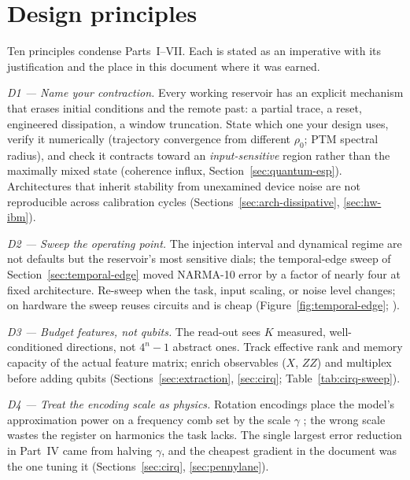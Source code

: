 
\section{Design principles}
\label{sec:design-principles}

Ten principles condense Parts~I--VII. Each is stated as an imperative with
its justification and the place in this document where it was earned.

\emph{D1 --- Name your contraction.} Every working reservoir has an explicit
mechanism that erases initial conditions and the remote past: a partial
trace, a reset, engineered dissipation, a window truncation. State which one
your design uses, verify it numerically (trajectory convergence from
different $\rho_0$; PTM spectral radius), and check it contracts toward an
\emph{input-sensitive} region rather than the maximally mixed state
(coherence influx, Section~\ref{sec:quantum-esp}). Architectures that
inherit stability from unexamined device noise are not reproducible across
calibration cycles (Sections~\ref{sec:arch-dissipative}, \ref{sec:hw-ibm}).

\emph{D2 --- Sweep the operating point.} The injection interval and dynamical
regime are not defaults but the reservoir's most sensitive dials; the
temporal-edge sweep of Section~\ref{sec:temporal-edge} moved NARMA-10 error
by a factor of nearly four at fixed architecture. Re-sweep when the task,
input scaling, or noise level changes; on hardware the sweep reuses circuits
and is cheap (Figure~\ref{fig:temporal-edge};
\citealp{kobayashi2026edge,martinez2021dynamical}).

\emph{D3 --- Budget features, not qubits.} The read-out sees $K$ measured,
well-conditioned directions, not $4^n-1$ abstract ones. Track effective rank
and memory capacity of the actual feature matrix; enrich observables
($X$, $ZZ$) and multiplex before adding qubits
(Sections~\ref{sec:extraction}, \ref{sec:cirq}; Table~\ref{tab:cirq-sweep}).

\emph{D4 --- Treat the encoding scale as physics.} Rotation encodings place
the model's approximation power on a frequency comb set by the scale
$\gamma$ \citep{schuld2021effect}; the wrong scale wastes the register on
harmonics the task lacks. The single largest error reduction in Part~IV came
from halving $\gamma$, and the cheapest gradient in the document was the one
tuning it (Sections~\ref{sec:cirq}, \ref{sec:pennylane}).

